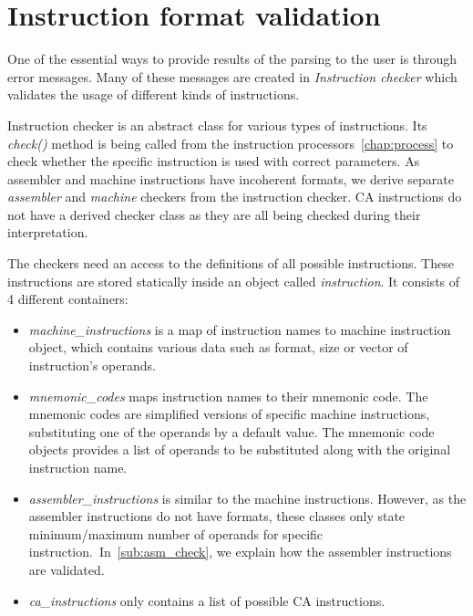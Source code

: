 \section{Instruction format validation}
\label{checker}
One of the essential ways to provide results of the parsing to the user is through error messages. Many of these messages are created in \emph{Instruction checker} which validates the usage of different kinds of instructions.

Instruction checker is an abstract class for various types of instructions. Its \emph{check()} method is being called from the instruction processors~\ref{chap:process} to check whether the specific instruction is used with correct parameters. As assembler and machine instructions have incoherent formats, we derive separate \emph{assembler} and \emph{machine} checkers from the instruction checker. CA instructions do not have a derived checker class as they are all being checked during their interpretation.

The checkers need an access to the definitions of all possible instructions. These instructions are stored statically inside an object called \emph{instruction}. It consists of 4 different containers:
\begin{itemize}
	\item \emph{machine\_instructions} is a map of instruction names to machine instruction object, which contains various data such as format, size or vector of instruction's operands.
	\item \emph{mnemonic\_codes} maps instruction names to their mnemonic code. The mnemonic codes are simplified versions of specific machine instructions, substituting one of the operands by a default value. The mnemonic code objects provides a list of operands to be substituted along with the original instruction name.
	\item \emph{assembler\_instructions} is similar to the machine instructions. However, as the assembler instructions do not have formats, these classes only state minimum/maximum number of operands for specific instruction.~In~\cref{sub:asm_check}, we explain how the assembler instructions are validated.
	\item \emph{ca\_instructions} only contains a list of possible CA instructions.
\end{itemize}

